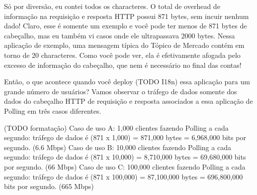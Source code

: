 \documentclass[a4paper,12pt]{article}
\begin{document}
Só por diversão, eu contei todos os characteres. O total de overhead de informação na requisição e resposta HTTP possui 871 bytes, sem incuir nenhum dado! Claro, esse é somente um exemplo e você pode ter menos de 871 bytes de cabeçalho, mas eu também vi casos onde ele ultrapassava 2000 bytes. Nessa aplicação de exemplo, uma mensagem típica do Tópico de Mercado contém em torno de 20 characteres. Como você pode ver, ela é efetivamente afogada pelo excesso de informação do cabeçalho, que nem é necessário no final das contas!

Então, o que acontece quando você deploy (TODO I18n) essa aplicação para um grande número de usuários? Vamos observar o tráfego de dados somente dos dados do cabeçalho HTTP de requisição e resposta associados a essa aplicação de Polling em três casos diferentes.

(TODO formatação)
Caso de uso A: 1,000 clientes fazendo Polling a cada segundo: tráfego de dados é (871 x 1,000) = 871,000 bytes = 6,968,000 bits por segundo. (6.6 Mbps)
Caso de uso B: 10,000 clientes fazendo Polling a cada segundo: tráfego de dados é (871 x 10,000) = 8,710,000 bytes = 69,680,000 bits por segundo. (66 Mbps)
Caso de uso C: 100,000 clientes fazendo Polling a cada segundo: tráfego de dados é (871 x 100,000) = 87,100,000 bytes = 696,800,000 bits por segundo. (665 Mbps)
\end{document}
